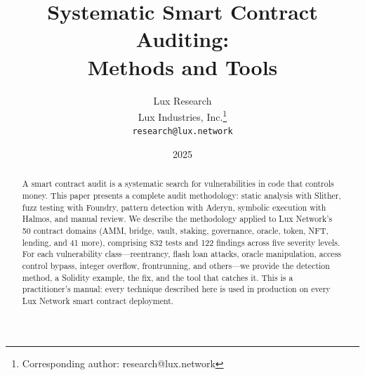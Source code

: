 \documentclass[11pt,a4paper]{article}
\title{Systematic Smart Contract Auditing:\\Methods and Tools}
\author{
Lux Research \\
Lux Industries, Inc.\thanks{Corresponding author: research@lux.network}\\
\texttt{research@lux.network}
}
\date{2025}
\begin{document}
\luxcoverpage

\begin{abstract}
A smart contract audit is a systematic search for vulnerabilities in code that controls
money. This paper presents a complete audit methodology: static analysis with Slither,
fuzz testing with Foundry, pattern detection with Aderyn, symbolic execution with Halmos,
and manual review. We describe the methodology applied to Lux Network's 50 contract
domains (AMM, bridge, vault, staking, governance, oracle, token, NFT, lending, and 41
more), comprising 832 tests and 122 findings across five severity levels. For each
vulnerability class---reentrancy, flash loan attacks, oracle manipulation, access control
bypass, integer overflow, frontrunning, and others---we provide the detection method,
a Solidity example, the fix, and the tool that catches it. This is a practitioner's manual:
every technique described here is used in production on every Lux Network smart contract
deployment.
\end{abstract}

\tableofcontents
\newpage












\end{document}
